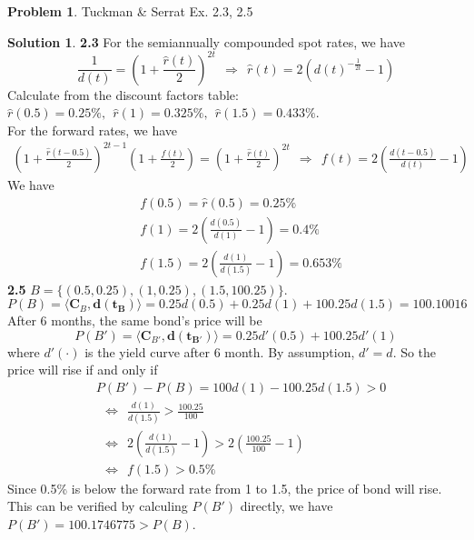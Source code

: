 \documentclass[a4paper, 10pt]{article}
\theoremstyle{definition}
\newtheorem{problem}{Problem}
\theoremstyle{hSol}
\newtheorem*{solution}{Solution}
\begin{document}
\begin{problem} Tuckman \& Serrat Ex. 2.3, 2.5
\end{problem}
\begin{solution} \textbf{2.3} For the semiannually compounded spot rates, we have
$$
\frac{1}{d(t)} = \left(1+\frac{\hat{r}(t)}{2}\right)^{2t}~~\Rightarrow~~\hat{r}(t) = 2\left(d(t)^{-\frac{1}{2t}} - 1\right)
$$
Calculate from the discount factors table: $\hat{r}(0.5) = 0.25\%,~~\hat{r}(1) = 0.325\%,~~\hat{r}(1.5) = 0.433\%$. \\
For the forward rates, we have
\begin{equation}
  \begin{split}
    \left(1+\frac{\hat{r}(t-0.5)}{2}\right)^{2t-1}\left(1+\frac{f(t)}{2}\right) = \left(1+\frac{\hat{r}(t)}{2}\right)^{2t}~~\Rightarrow~~f(t) = 2\left(\frac{d(t-0.5)}{d(t)} - 1\right)
  \end{split}
\end{equation}
We have
\begin{equation}
  \begin{split}
    &f(0.5) = \hat{r}(0.5) = 0.25\%\\
    &f(1) = 2\left(\frac{d(0.5)}{d(1)} - 1\right) = 0.4\%\\
    &f(1.5) = 2\left(\frac{d(1)}{d(1.5)} - 1\right) = 0.653\%
  \end{split}
\end{equation}
\textbf{2.5} $B=\{(0.5, 0.25), (1, 0.25), (1.5, 100.25)\}$.
$$
P(B) = \langle \bm{C}_B,  \bm{d}(\bm{t_B}) \rangle = 0.25d(0.5) + 0.25d(1) + 100.25d(1.5) = 100.10016
$$
After 6 months, the same bond's price will be
$$
P(B') = \langle \bm{C}_{B'},  \bm{d}(\bm{t_{B'}}) \rangle = 0.25d'(0.5) + 100.25d'(1)
$$
where $d'(\cdot)$ is the yield curve after 6 month. By assumption, $d'=d$. So the price will rise if and only if
\begin{equation}
  \begin{split}
    & P(B') - P(B) = 100d(1) - 100.25d(1.5) > 0 \\
    & ~~ \iff ~~\frac{d(1)}{d(1.5)} > \frac{100.25}{100} \\
    & ~~ \iff ~~2\left(\frac{d(1)}{d(1.5)} - 1\right)> 2\left(\frac{100.25}{100} - 1\right) \\
    & ~~ \iff ~~ f(1.5) > 0.5\%
  \end{split}
\end{equation}
Since 0.5\% is below the forward rate from 1 to 1.5, the price of bond will rise. This can be verified by calculing $P(B')$ directly, we have $P(B')=100.1746775 > P(B)$.

\end{solution}
\end{document}
